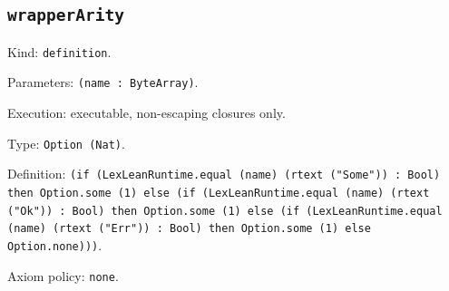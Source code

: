 \documentclass[11pt]{article}
\begin{document}
\subsection*{\texttt{wrapperArity}}
\noindent Kind: \texttt{definition}.\par
\noindent Parameters: \texttt{(name : ByteArray)}.\par
\noindent Execution: executable, non-escaping closures only.\par
\noindent Type: \texttt{Option (Nat)}.\par
\noindent Definition: \texttt{(if (LexLeanRuntime.equal (name) (rtext ("Some")) : Bool) then Option.some (1) else (if (LexLeanRuntime.equal (name) (rtext ("Ok")) : Bool) then Option.some (1) else (if (LexLeanRuntime.equal (name) (rtext ("Err")) : Bool) then Option.some (1) else Option.none)))}.\par
\noindent Axiom policy: \texttt{none}.\par
\end{document}
